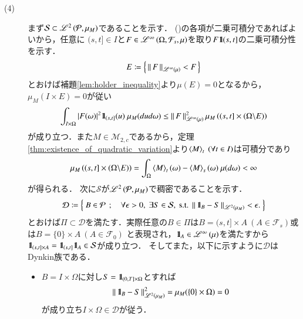 \begin{prf}
\begin{description}
			\item[(4)]
				まず$\mathcal{S} \subset \mathscr{L}^{2} \left(\mathcal{P},\mu_M\right)$であることを示す．
				()の各項が二乗可積分であればよいから，任意に
				$(s,t] \in I$と$F \in \mathscr{L}^{\infty} \left(\Omega,\mathcal{F}_s,\mu\right)$を取り$F \mbox{1}\hspace{-0.25em}\mbox{l}{(s,t]}$の二乗可積分性を示す．
				\begin{align}
					E \coloneqq \left\{\, \left\|\, F\, \right\|_{\mathscr{L}^{\infty} \left(\mu\right)} < F\, \right\}
				\end{align}
				とおけば補題\ref{lem:holder_inequality}より$\mu(E) = 0$となるから，$\mu_M(I \times E) = 0$が従い
				\begin{align}
					\int_{I \times \Omega} |F(\omega)|^2 \mbox{1}\hspace{-0.25em}\mbox{l}_{(s,t]}(u)\ \mu_M(dud\omega) 
					\leq \left\|\, F\, \right\|_{\mathscr{L}^{\infty} \left(\mu\right)}^2 \mu_M\left((s,t] \times (\Omega \backslash E)\right) 
				\end{align}
				が成り立つ．また$M \in \mathcal{M}_{2,c}$であるから，定理\ref{thm:existence_of_quadratic_variation}より$\inprod<M>_t\ (\forall t \in I)$は可積分であり
				\begin{align}
					\mu_M\left((s,t] \times (\Omega \backslash E)\right) = \int_{\Omega} \inprod<M>_t(\omega) - \inprod<M>_s(\omega)\ \mu(d\omega) < \infty
				\end{align}
				が得られる．
				次に$\mathcal{S}$が$\mathscr{L}^{2} \left(\mathcal{P},\mu_M\right)$で稠密であることを示す．
				\begin{align}
					\mathcal{D} \coloneqq \left\{\ B \in \mathcal{P}\ \, ; \quad \mbox{$\forall \epsilon > 0,\ \exists S \in \mathcal{S},\ \mbox{s.t.}\ \left\|\, \mbox{1}\hspace{-0.25em}\mbox{l}_B - S\, \right\|_{\mathscr{L}^{2} \left(\mu_M\right)} < \epsilon.$}\ \right\}
				\end{align}
				とおけば$\Pi \subset \mathcal{D}$を満たす．実際任意の$B \in \Pi$は$B = (s,t] \times A\ (A \in \mathcal{F}_s)$或は$B = \{0\} \times A\ (A \in \mathcal{F}_0)$
				と表現され，$\mbox{1}\hspace{-0.25em}\mbox{l}_A \in \mathscr{L}^{\infty} \left(\mu\right)$を満たすから$\mbox{1}\hspace{-0.25em}\mbox{l}_{(s,t] \times A} = \mbox{1}\hspace{-0.25em}\mbox{l}_{(s,t]} \mbox{1}\hspace{-0.25em}\mbox{l}_A \in \mathcal{S}$が成り立つ．
				そしてまた，以下に示すように$\mathcal{D}$はDynkin族である．
				\begin{itemize}
					\item $B = I \times \Omega$に対し$S = \mbox{1}\hspace{-0.25em}\mbox{l}_{(0,T] \times \Omega}$とすれば
						\begin{align}
							\left\|\, \mbox{1}\hspace{-0.25em}\mbox{l}_B - S\, \right\|_{\mathscr{L}^{2} \left(\mu_M\right)}^2
							= \mu_M(\{0\} \times \Omega)
							= 0
						\end{align}
						が成り立ち$I \times \Omega \in \mathcal{D}$が従う．
					

\end{itemize}
\end{description}
\end{prf}
